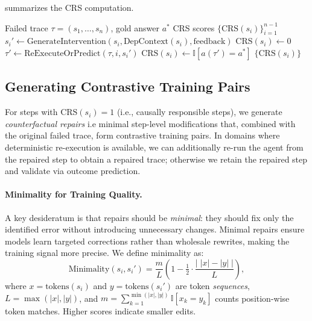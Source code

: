 \documentclass{article}
\theoremstyle{plain}
\theoremstyle{definition}
\theoremstyle{remark}
\begin{document}
 summarizes the CRS computation.

\begin{algorithm}[tb]
   \caption{Causal Responsibility Scoring}
   \label{alg:crs}
\begin{algorithmic}
    Failed trace $\tau = (s_1, \ldots, s_n)$, gold answer $a^*$
    CRS scores $\{\text{CRS}(s_i)\}_{i=1}^{n-1}$
   \STATE $s_i' \leftarrow \text{GenerateIntervention}(s_i, \text{DepContext}(s_i), \text{feedback})$
   \STATE $\text{CRS}(s_i) \leftarrow 0$ 
   \ELSE
   \STATE $\tau' \leftarrow \text{ReExecuteOrPredict}(\tau, i, s_i')$
   \STATE $\text{CRS}(s_i) \leftarrow \mathbb{I}[a(\tau') = a^*]$
   \ENDIF
   \ENDFOR
    $\{\text{CRS}(s_i)\}$
\end{algorithmic}
\end{algorithm}

\subsection{Generating Contrastive Training Pairs}

For steps with $\text{CRS}(s_i) = 1$ (i.e., causally responsible steps), we generate \emph{counterfactual repairs} i.e minimal step-level modifications that, combined with the original failed trace, form contrastive training pairs. In domains where deterministic re-execution is available, we can additionally re-run the agent from the repaired step to obtain a repaired trace; otherwise we retain the repaired step and validate via outcome prediction.

\paragraph{Minimality for Training Quality.}
A key desideratum is that repairs should be \emph{minimal}: they should fix only the identified error without introducing unnecessary changes. Minimal repairs ensure models learn targeted corrections rather than wholesale rewrites, making the training signal more precise. We define minimality as:
\begin{equation}
    \text{Minimality}(s_i, s_i') =
    \frac{m}{L}\left(1 - \tfrac{1}{2}\cdot\frac{\left|\;|x|-|y|\;\right|}{L}\right),
\end{equation}
where $x=\text{tokens}(s_i)$ and $y=\text{tokens}(s_i')$ are token \emph{sequences}, $L=\max(|x|,|y|)$, and $m=\sum_{k=1}^{\min(|x|,|y|)} \mathbb{I}[x_k = y_k]$ counts position-wise token matches. Higher scores indicate smaller edits.
\end{document}
